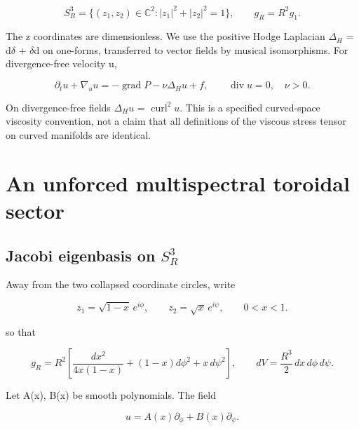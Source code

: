\documentclass[10pt,letterpaper]{article}
\theoremstyle{remark}
\begin{document}
\begin{equation}
\tag{1}\label{eq:1}
S_R^3=\{(z_1,z_2)\in\mathbb C^2:|z_1|^2+|z_2|^2=1\},\qquad g_R=R^2g_1.
\end{equation}

The z coordinates are dimensionless. We use the positive Hodge Laplacian \(\Delta_H\) = d\(\delta \) + \(\delta \)d on one-forms, transferred to vector fields by musical isomorphisms. For divergence-free velocity u,



\begin{equation}
\tag{2}\label{eq:2}
\partial_tu+\nabla_u u=-\operatorname{grad}P-\nu\Delta_Hu+f,\qquad\operatorname{div}u=0,\quad\nu>0.
\end{equation}

On divergence-free fields \(\Delta_H u\) = \(\operatorname{curl}^2u\). This is a specified curved-space viscosity convention, not a claim that all definitions of the viscous stress tensor on curved manifolds are identical.


\section{An unforced multispectral toroidal sector}

\subsection{Jacobi eigenbasis on $S_R^3$}

Away from the two collapsed coordinate circles, write



\begin{equation}
\tag{3}\label{eq:3}
z_1=\sqrt{1-x}\,e^{i\phi},\qquad z_2=\sqrt{x}\,e^{i\psi},\qquad 0<x<1.
\end{equation}

so that



\begin{equation}
\tag{4}\label{eq:4}
g_R=R^2\left[\frac{dx^2}{4x(1-x)}+(1-x)d\phi^2+x\,d\psi^2\right],\qquad dV=\frac{R^3}{2}\,dx\,d\phi\,d\psi.
\end{equation}

Let A(x), B(x) be smooth polynomials. The field



\begin{equation}
\tag{5}\label{eq:5}
u=A(x)\partial_\phi+B(x)\partial_\psi.
\end{equation}
\end{document}
